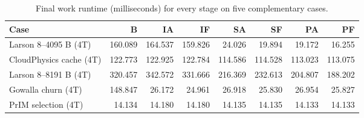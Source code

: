 \begin{table}[t]
\caption{Final work runtime (milliseconds) for every stage on five complementary cases.}\label{tab:final-main}
\centering\small
\begin{tabular}{lrrrrrrr}\toprule
Case & B & IA & IF & SA & SF & PA & PF \\ \midrule
Larson 8--4095 B (4T) & 160.089 & 164.537 & 159.826 & 24.026 & 19.894 & 19.172 & 16.255 \\
CloudPhysics cache (4T) & 122.773 & 122.925 & 122.784 & 114.586 & 114.528 & 113.023 & 113.075 \\
Larson 8--8191 B (4T) & 320.457 & 342.572 & 331.666 & 216.369 & 232.613 & 204.807 & 188.202 \\
Gowalla churn (4T) & 148.847 & 26.172 & 24.961 & 26.918 & 25.830 & 26.954 & 25.827 \\
PrIM selection (4T) & 14.134 & 14.180 & 14.180 & 14.135 & 14.135 & 14.133 & 14.133 \\
\bottomrule\end{tabular}
\par\vspace{2pt}{\footnotesize B: scan fixed-2; I: indexed; S: indexed plus 64 KiB slabs; P: indexed plus slabs plus pinned metadata. A uses adaptive interval 64; F retains at most two empty spans/class. All rows use four tasklets.}
\end{table}
